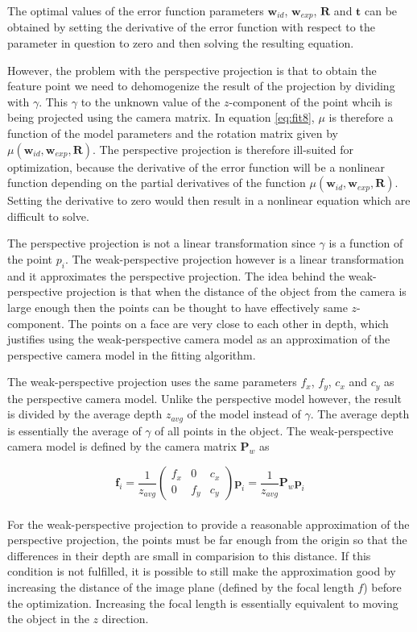 \documentclass[11pt,a4paper]{report}
\begin{document}
The optimal values of the error function parameters $\mathbf{w}_{id}$, $\mathbf{w}_{exp}$,
$\mathbf{R}$ and $\mathbf{t}$ can be obtained by setting the derivative of the
error function with respect to the parameter in question to zero and then
solving the resulting equation.


However, the problem with the perspective projection is that to obtain the feature point
we need to dehomogenize the result of the projection by dividing with
$\gamma$. This $\gamma$ to the unknown value of the $z$-component of the point
whcih is being projected using the camera matrix. In equation \ref{eq:fit8}, $\mu$ is therefore a function of the model parameters and the rotation
matrix given by $\mu(\mathbf{w}_{id},\mathbf{w}_{exp},\mathbf{R})$. The
  perspective projection is therefore ill-suited for optimization, because the derivative of the error function will be
a nonlinear function depending on the partial derivatives of the function
$\mu(\mathbf{w}_{id},\mathbf{w}_{exp},\mathbf{R})$. Setting the derivative to
  zero would then result in a nonlinear equation which are difficult to solve.

The perspective projection is not a linear transformation since $\gamma$ is a
function of the point $p_i$. The weak-perspective projection however is a linear
transformation and it approximates the perspective projection. The idea
behind the weak-perspective projection is that when the distance of the object
from the camera is large enough then the points can be thought to have effectively same
$z$-component. The points on a face are very close to each other in depth, which justifies using the weak-perspective camera model as an approximation
of the perspective camera model in the fitting algorithm. 

The weak-perspective projection uses the same parameters $f_x$, $f_y$, $c_x$ and
$c_y$ as the perspective camera model. Unlike the perspective model however, the
result is divided by the average depth $z_{avg}$ of the model instead of
$\gamma$. The average depth is essentially the average of $\gamma$ of all points
in the object. The weak-perspective camera model is defined by the camera matrix
$\mathbf{P}_w$ as 

\begin{equation}\label{eq:fig9}
 \mathbf{f}_i = \frac{1}{z_{avg}}\begin{pmatrix}f_x&0&c_x\\0&f_y&c_y\end{pmatrix}\mathbf{p}_i
    = \frac{1}{z_{avg}}\mathbf{P}_w\mathbf{p}_i
\end{equation}\\
For the weak-perspective projection to provide a reasonable approximation of the
perspective projection, the points must be far enough from the origin so that
the differences in their depth are small in comparision to this distance. If this condition is not fulfilled, it is
possible to still make the approximation good by increasing the distance of the
image plane (defined by the focal length $f$) before the optimization. Increasing the focal length
is essentially equivalent to moving the object in the $z$ direction.
\end{document}
